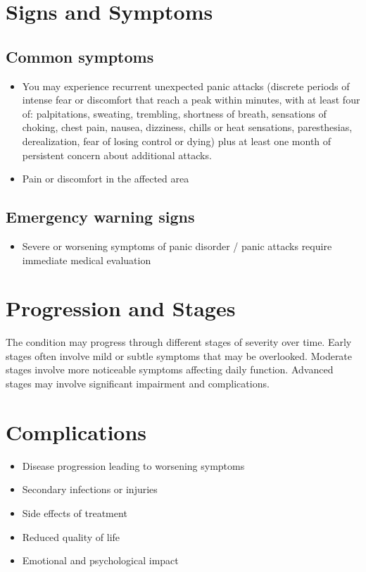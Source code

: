 \section{Signs and Symptoms}

\subsection{Common symptoms}
\begin{itemize}[noitemsep]
  \item You may experience recurrent unexpected panic attacks (discrete periods of intense fear or discomfort that reach a peak within minutes, with at least four of: palpitations, sweating, trembling, shortness of breath, sensations of choking, chest pain, nausea, dizziness, chills or heat sensations, paresthesias, derealization, fear of losing control or dying) plus at least one month of persistent concern about additional attacks.
  \item Pain or discomfort in the affected area
  \end{itemize}

\subsection{Emergency warning signs}
\begin{itemize}[noitemsep]
  \item Severe or worsening symptoms of panic disorder / panic attacks require immediate medical evaluation
\end{itemize}
\section{Progression and Stages}
The condition may progress through different stages of severity over time. Early stages often involve mild or subtle symptoms that may be overlooked. Moderate stages involve more noticeable symptoms affecting daily function. Advanced stages may involve significant impairment and complications.
\section{Complications}
\begin{itemize}[noitemsep]
  \item Disease progression leading to worsening symptoms
  \item Secondary infections or injuries
  \item Side effects of treatment
  \item Reduced quality of life
  \item Emotional and psychological impact
\end{itemize}
